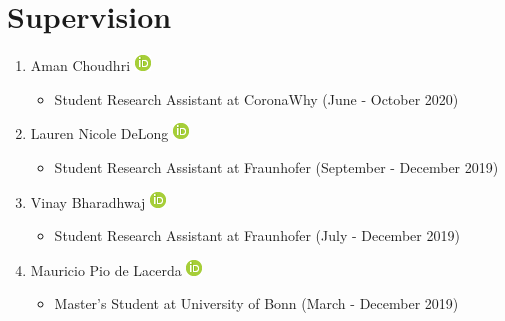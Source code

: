 \documentclass[10pt,a4paper,sans]{moderncv} %
\begin{document}
    \section{Supervision}
    \begin{enumerate}
    \itemsep0.5em
        \item     Aman Choudhri {\scriptsize     \href{https://orcid.org/0000-0003-4963-6651}{\includegraphics[scale=0.5]{img/ORCIDiD_icon16x16}}
}    \begin{itemize}
        \item {\scriptsize Student Research Assistant at CoronaWhy (June - October 2020)}
    \end{itemize}

        \item     Lauren Nicole DeLong {\scriptsize     \href{https://orcid.org/0000-0001-6618-3370}{\includegraphics[scale=0.5]{img/ORCIDiD_icon16x16}}
}    \begin{itemize}
        \item {\scriptsize Student Research Assistant at Fraunhofer (September - December 2019)}
    \end{itemize}

        \item     Vinay Bharadhwaj {\scriptsize     \href{https://orcid.org/0000-0002-9901-9494}{\includegraphics[scale=0.5]{img/ORCIDiD_icon16x16}}
}    \begin{itemize}
        \item {\scriptsize Student Research Assistant at Fraunhofer (July - December 2019)}
    \end{itemize}

        \item     Mauricio Pio de Lacerda {\scriptsize     \href{https://orcid.org/0000-0002-1770-3007}{\includegraphics[scale=0.5]{img/ORCIDiD_icon16x16}}
}    \begin{itemize}
        \item {\scriptsize Master's Student at University of Bonn (March - December 2019)}
    \end{itemize}


\end{enumerate}
\end{document}
